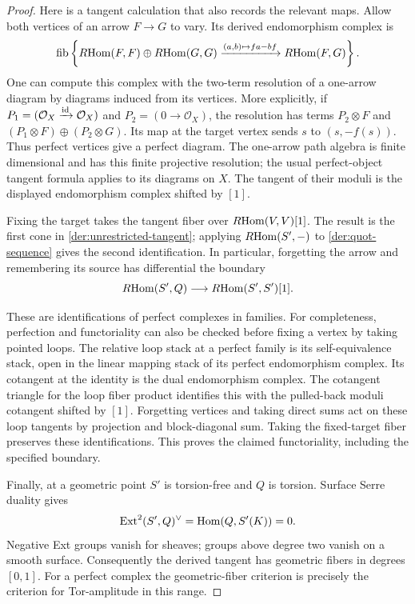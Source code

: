 \begin{proof}
Here is a tangent calculation that also records the relevant maps.
Allow both vertices of an arrow $F\to G$ to vary.  Its derived
endomorphism complex is
\[
\operatorname{fib}\left\{
R\!\operatorname{Hom}(F,F)\oplus R\!\operatorname{Hom}(G,G)
\xrightarrow{(a,b)\mapsto f a-b f}R\!\operatorname{Hom}(F,G)
\right\}.
\]
One can compute this complex with the two-term resolution of a one-arrow
diagram by diagrams induced from its vertices.  More explicitly, if
$P_1=(\mathcal O_X\xrightarrow{\operatorname{id}}\mathcal O_X)$ and
$P_2=(0\to\mathcal O_X)$, the resolution has terms
$P_2\otimes F$ and $(P_1\otimes F)\oplus(P_2\otimes G)$.
Its map at the target vertex sends $s$ to $(s,-f(s))$.
Thus perfect vertices give a perfect diagram.  The one-arrow path algebra
is finite dimensional and has this finite projective resolution; the
usual perfect-object tangent formula applies to its diagrams on $X$.
The tangent of their moduli is the displayed endomorphism complex
shifted by $[1]$.

Fixing the target takes the tangent fiber over
$R\!\operatorname{Hom}(V,V)[1]$.  The result is the first cone in
\eqref{der:unrestricted-tangent}; applying $R\!\operatorname{Hom}(S',-)$ to
\eqref{der:quot-sequence} gives the second identification.
In particular, forgetting the arrow and remembering its source has
differential the boundary
\begin{equation}\label{der:source-boundary}
R\!\operatorname{Hom}(S',Q)\longrightarrow R\!\operatorname{Hom}(S',S')[1].
\end{equation}

These are identifications of perfect complexes in families.  For
completeness, perfection and functoriality can also be checked before
fixing a vertex by taking pointed loops.  The relative loop stack at a
perfect family is its self-equivalence stack, open in the linear mapping
stack of its perfect endomorphism complex.  Its cotangent at the identity
is the dual endomorphism complex.  The cotangent triangle for the loop
fiber product identifies this with the pulled-back moduli cotangent
shifted by $[1]$.  Forgetting vertices and taking direct sums act on these
loop tangents by projection and block-diagonal sum.  Taking the fixed-target
fiber preserves these identifications.  This proves the claimed
functoriality, including the specified boundary.

Finally, at a geometric point $S'$ is torsion-free and $Q$ is torsion.
Surface Serre duality gives
\[
\operatorname{Ext}^2(S',Q)^\vee=\operatorname{Hom}(Q,S'(K))=0.
\]
Negative Ext groups vanish for sheaves; groups above degree two vanish
on a smooth surface.  Consequently the derived tangent has geometric
fibers in degrees $[0,1]$.  For a perfect complex the geometric-fiber
criterion is precisely the criterion for Tor-amplitude in this range.
\end{proof}

